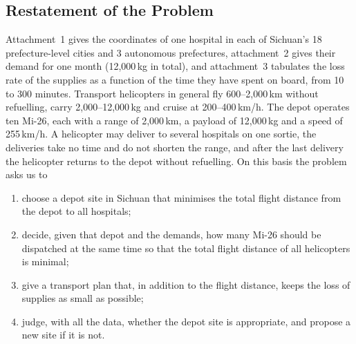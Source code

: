 \documentclass[11pt,a4paper]{article}
\theoremstyle{definition}
\begin{document}
\subsection{Restatement of the Problem}
Attachment~1 gives the coordinates of one hospital in each of Sichuan's 18 prefecture-level cities and 3 autonomous prefectures, attachment~2 gives their demand for one month (12{,}000\,kg in total), and attachment~3 tabulates the loss rate of the supplies as a function of the time they have spent on board, from 10 to 300 minutes.
Transport helicopters in general fly 600--2{,}000\,km without refuelling, carry 2{,}000--12{,}000\,kg and cruise at 200--400\,km/h.
The depot operates ten Mi-26, each with a range of 2{,}000\,km, a payload of 12{,}000\,kg and a speed of 255\,km/h.
A helicopter may deliver to several hospitals on one sortie, the deliveries take no time and do not shorten the range, and after the last delivery the helicopter returns to the depot without refuelling.
On this basis the problem asks us to
\begin{enumerate}[label=(\arabic*),itemsep=2pt]
\item choose a depot site in Sichuan that minimises the total flight distance from the depot to all hospitals;
\item decide, given that depot and the demands, how many Mi-26 should be dispatched at the same time so that the total flight distance of all helicopters is minimal;
\item give a transport plan that, in addition to the flight distance, keeps the loss of supplies as small as possible;
\item judge, with all the data, whether the depot site is appropriate, and propose a new site if it is not.
\end{enumerate}
\end{document}
